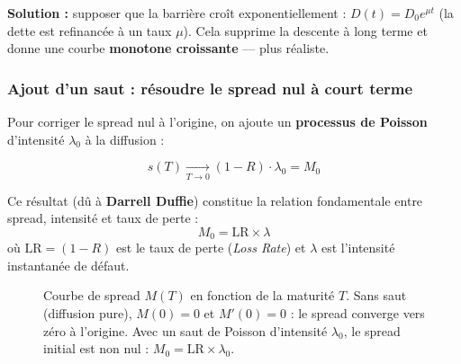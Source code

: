 \textbf{Solution :} supposer que la barrière croît exponentiellement : $D(t) = D_0 e^{\mu t}$ (la dette est refinancée à un taux $\mu$). Cela supprime la descente à long terme et donne une courbe \textbf{monotone croissante} — plus réaliste.

\subsubsection{Ajout d'un saut : résoudre le spread nul à court terme}

Pour corriger le spread nul à l'origine, on ajoute un \textbf{processus de Poisson} d'intensité $\lambda_0$ à la diffusion :

\begin{tcolorbox}[colback=blue!5,colframe=blue!40,title=Spread court terme avec saut]
\[
s(T) \underset{T \to 0}{\longrightarrow} (1-R) \cdot \lambda_0 = M_0
\]
\end{tcolorbox}

Ce résultat (dû à \textbf{Darrell Duffie}) constitue la relation fondamentale entre spread, intensité et taux de perte :
\[
\boxed{M_0 = \mathrm{LR} \times \lambda}
\]
où $\mathrm{LR} = (1-R)$ est le taux de perte (\textit{Loss Rate}) et $\lambda$ est l'intensité instantanée de défaut.

\begin{figure}[htbp]
    \centering
    \caption{Courbe de spread $M(T)$ en fonction de la maturité $T$. Sans saut (diffusion pure), $M(0)=0$ et $M'(0)=0$ : le spread converge vers zéro à l'origine. Avec un saut de Poisson d'intensité $\lambda_0$, le spread initial est non nul : $M_0 = \mathrm{LR} \times \lambda_0$.}
    \label{fig:spread_curve}
\end{figure}

